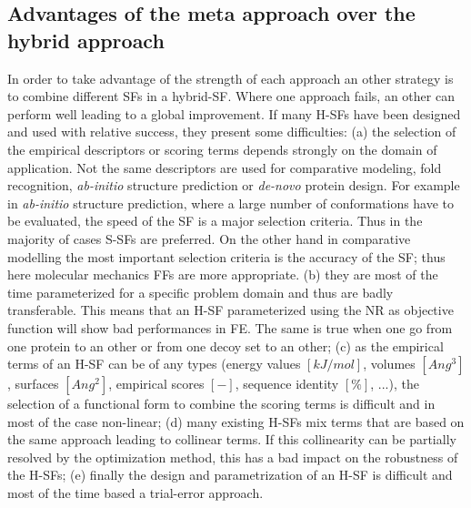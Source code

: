 \documentclass[a4paper,20pt,notitlepage,openbib]{article}
\begin{document}
\subsection{Advantages of the meta approach over the hybrid approach}
In order to take advantage of the strength of each approach an other strategy is to combine different SFs in a hybrid-SF. Where one approach fails, an other can perform well leading to a global improvement. If many H-SFs have been designed and used with relative success, they present some difficulties: (a) the selection of the empirical descriptors or scoring terms depends strongly on the domain of application. Not the same descriptors are used for comparative modeling, fold recognition, \textit{ab-initio} structure prediction or \textit{de-novo} protein design. For example in \textit{ab-initio} structure prediction, where a large number of conformations have to be evaluated, the speed of the SF is a major selection criteria. Thus in the majority of cases S-SFs are preferred. On the other hand in comparative modelling the most important selection criteria is the accuracy of the SF; thus here molecular mechanics FFs are more appropriate. (b)  they are most of the time parameterized for a specific problem domain and thus are badly transferable. This means that an H-SF  parameterized using the NR as objective function will show bad performances in FE. The same is true when one go from one protein to an other or from one decoy set to an other; (c) as the empirical terms of an H-SF can be of any types (energy values $[kJ/mol]$, volumes $[Ang^{3}]$, surfaces $[Ang^{2}]$, empirical scores $[-]$, sequence identity $[\%]$, ...), the selection of a functional form to combine the scoring terms is difficult and in most of the case non-linear; (d) many existing H-SFs mix terms that are based on the same approach leading to collinear terms. If this collinearity can be partially resolved by the optimization method, this has a bad impact on the robustness of the H-SFs; (e) finally the design and parametrization of an H-SF is difficult and most of the time based a trial-error approach.
\end{document}

